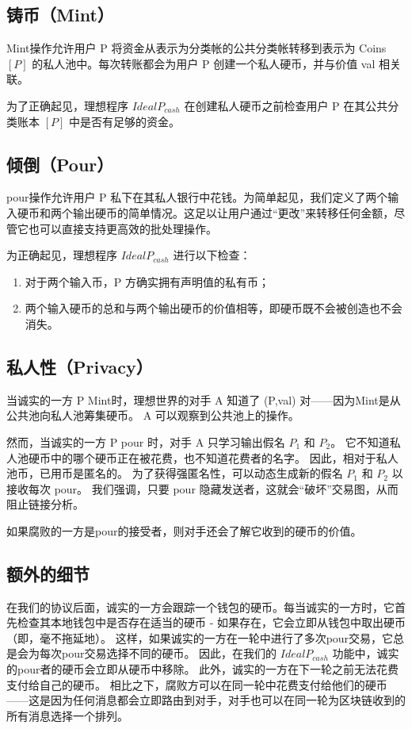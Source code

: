 \documentclass{xduugtrans}
\begin{document}
\subsection{铸币（Mint）}

Mint操作允许用户 P 将资金从表示为分类帐的公共分类帐转移到表示为 Coins $\left[P\right]$ 的私人池中。每次转账都会为用户 P 创建一个私人硬币，并与价值 val 相关联。

为了正确起见，理想程序 $IdealP_{cash}$ 在创建私人硬币之前检查用户 P 在其公共分类账本 $\left[P\right]$ 中是否有足够的资金。

\subsection{倾倒（Pour）}

pour操作允许用户 P 私下在其私人银行中花钱。为简单起见，我们定义了两个输入硬币和两个输出硬币的简单情况。这足以让用户通过“更改”来转移任何金额，尽管它也可以直接支持更高效的批处理操作。

为正确起见，理想程序 $IdealP_{cash}$ 进行以下检查：
\begin{enumerate}
    \item 对于两个输入币，P 方确实拥有声明值的私有币； 
    \item 两个输入硬币的总和与两个输出硬币的价值相等，即硬币既不会被创造也不会消失。
\end{enumerate}

\subsection{私人性（Privacy）}

当诚实的一方 P Mint时，理想世界的对手 A 知道了 (P,val) 对——因为Mint是从公共池向私人池筹集硬币。 A 可以观察到公共池上的操作。

然而，当诚实的一方 P pour 时，对手 A 只学习输出假名 $P_1$ 和 $P_2$。 它不知道私人池硬币中的哪个硬币正在被花费，也不知道花费者的名字。 因此，相对于私人池币，已用币是匿名的。 为了获得强匿名性，可以动态生成新的假名 $P_1$ 和 $P_2$ 以接收每次 pour。 我们强调，只要 pour 隐藏发送者，这就会“破坏”交易图，从而阻止链接分析。

如果腐败的一方是pour的接受者，则对手还会了解它收到的硬币的价值。

\subsection{额外的细节}

在我们的协议后面，诚实的一方会跟踪一个钱包的硬币。每当诚实的一方时，它首先检查其本地钱包中是否存在适当的硬币 - 如果存在，它会立即从钱包中取出硬币（即，毫不拖延地）。 这样，如果诚实的一方在一轮中进行了多次pour交易，它总是会为每次pour交易选择不同的硬币。 因此，在我们的  $IdealP_{cash}$ 功能中，诚实的pour者的硬币会立即从硬币中移除。 此外，诚实的一方在下一轮之前无法花费支付给自己的硬币。 相比之下，腐败方可以在同一轮中花费支付给他们的硬币——这是因为任何消息都会立即路由到对手，对手也可以在同一轮为区块链收到的所有消息选择一个排列。
\end{document}
